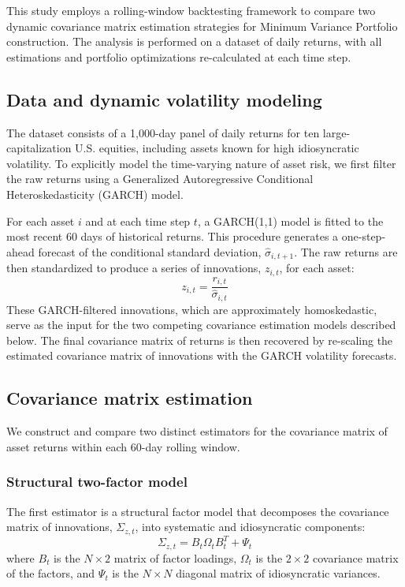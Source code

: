 \documentclass[]{article}
\begin{document}
This study employs a rolling-window backtesting framework to compare two dynamic covariance matrix estimation strategies for Minimum Variance Portfolio construction. The analysis is performed on a dataset of daily returns, with all estimations and portfolio optimizations re-calculated at each time step.

\subsection{Data and dynamic volatility modeling}
The dataset consists of a 1,000-day panel of daily returns for ten large-capitalization U.S. equities, including assets known for high idiosyncratic volatility. To explicitly model the time-varying nature of asset risk, we first filter the raw returns using a Generalized Autoregressive Conditional Heteroskedasticity (GARCH) model.

For each asset $i$ and at each time step $t$, a GARCH(1,1) model is fitted to the most recent 60 days of historical returns. This procedure generates a one-step-ahead forecast of the conditional standard deviation, $\hat{\sigma}_{i,t+1}$. The raw returns are then standardized to produce a series of innovations, $z_{i,t}$, for each asset:
\begin{equation}
z_{i,t} = \frac{r_{i,t}}{\hat{\sigma}_{i,t}}
\end{equation}
These GARCH-filtered innovations, which are approximately homoskedastic, serve as the input for the two competing covariance estimation models described below. The final covariance matrix of returns is then recovered by re-scaling the estimated covariance matrix of innovations with the GARCH volatility forecasts.

\subsection{Covariance matrix estimation}
We construct and compare two distinct estimators for the covariance matrix of asset returns within each 60-day rolling window.

\subsubsection{Structural two-factor model}
The first estimator is a structural factor model that decomposes the covariance matrix of innovations, $\Sigma_{z,t}$, into systematic and idiosyncratic components:
\begin{equation}
\Sigma_{z,t} = B_t \Omega_t B_t^T + \Psi_t
\end{equation}
where $B_t$ is the $N \times 2$ matrix of factor loadings, $\Omega_t$ is the $2 \times 2$ covariance matrix of the factors, and $\Psi_t$ is the $N \times N$ diagonal matrix of idiosyncratic variances.
\end{document}
